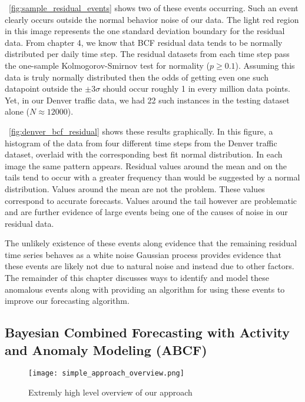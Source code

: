 ~\ref{fig:sample_residual_events} shows two of these events occurring.  Such an event clearly occurs outside the normal behavior noise of our data.  The light red region in this image represents the one standard deviation boundary for the residual data.  From chapter 4, we know that BCF residual data tends to be normally distributed per daily time step.  The residual datasets from each time step pass the one-sample Kolmogorov-Smirnov \cite{Marsaglia2003, Lopes2007} test for normality ($p \ge 0.1$).  Assuming this data is truly normally distributed then the odds of getting even one such datapoint outside the $\pm 3 \sigma$ should occur roughly 1 in every million data points.  Yet, in our Denver traffic data, we had 22 such instances in the testing dataset alone ($N \approx 12000$).  

~\ref{fig:denver_bcf_residual} shows these results graphically.  In this figure, a histogram of the data from four different time steps from the Denver traffic dataset, overlaid with the corresponding best fit normal distribution.  In each image the same pattern appears.  Residual values around the mean and on the tails tend to occur with a greater frequency than would be suggested by a normal distribution.  Values around the mean are not the problem.  These values correspond to accurate forecasts.  Values around the tail however are problematic and are further evidence of large events being one of the causes of noise in our residual data.

The unlikely existence of these events along evidence that the remaining residual time series behaves as a white noise Gaussian process provides evidence that these events are likely not due to natural noise and instead due to other factors.  The remainder of this chapter discusses ways to identify and model these anomalous events along with providing an algorithm for using these events to improve our forecasting algorithm.


\subsection{Bayesian Combined Forecasting with Activity and Anomaly Modeling (ABCF)}

\begin{wrapfigure}{L}{0.3\textwidth}
\centering
\texttt{[image: simple\_approach\_overview.png]}
\caption{Extremly high level overview of our approach}
\label{fig:highlevel_overview}
\end{wrapfigure}

